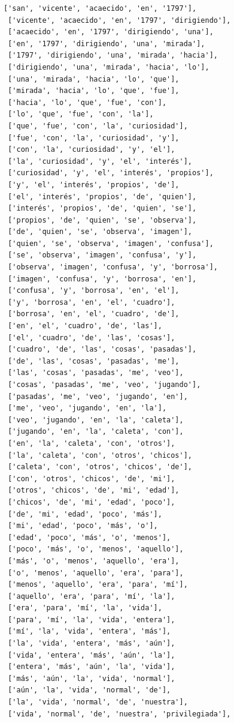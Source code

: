 \documentclass[11pt]{article}
\begin{document}
\begin{tcolorbox}[breakable, size=fbox, boxrule=1pt, pad at break*=1mm,colback=cellbackground, colframe=cellborder]
\begin{Verbatim}[commandchars=\\\{\}]
 ['san', 'vicente', 'acaecido', 'en', '1797'],
 ['vicente', 'acaecido', 'en', '1797', 'dirigiendo'],
 ['acaecido', 'en', '1797', 'dirigiendo', 'una'],
 ['en', '1797', 'dirigiendo', 'una', 'mirada'],
 ['1797', 'dirigiendo', 'una', 'mirada', 'hacia'],
 ['dirigiendo', 'una', 'mirada', 'hacia', 'lo'],
 ['una', 'mirada', 'hacia', 'lo', 'que'],
 ['mirada', 'hacia', 'lo', 'que', 'fue'],
 ['hacia', 'lo', 'que', 'fue', 'con'],
 ['lo', 'que', 'fue', 'con', 'la'],
 ['que', 'fue', 'con', 'la', 'curiosidad'],
 ['fue', 'con', 'la', 'curiosidad', 'y'],
 ['con', 'la', 'curiosidad', 'y', 'el'],
 ['la', 'curiosidad', 'y', 'el', 'interés'],
 ['curiosidad', 'y', 'el', 'interés', 'propios'],
 ['y', 'el', 'interés', 'propios', 'de'],
 ['el', 'interés', 'propios', 'de', 'quien'],
 ['interés', 'propios', 'de', 'quien', 'se'],
 ['propios', 'de', 'quien', 'se', 'observa'],
 ['de', 'quien', 'se', 'observa', 'imagen'],
 ['quien', 'se', 'observa', 'imagen', 'confusa'],
 ['se', 'observa', 'imagen', 'confusa', 'y'],
 ['observa', 'imagen', 'confusa', 'y', 'borrosa'],
 ['imagen', 'confusa', 'y', 'borrosa', 'en'],
 ['confusa', 'y', 'borrosa', 'en', 'el'],
 ['y', 'borrosa', 'en', 'el', 'cuadro'],
 ['borrosa', 'en', 'el', 'cuadro', 'de'],
 ['en', 'el', 'cuadro', 'de', 'las'],
 ['el', 'cuadro', 'de', 'las', 'cosas'],
 ['cuadro', 'de', 'las', 'cosas', 'pasadas'],
 ['de', 'las', 'cosas', 'pasadas', 'me'],
 ['las', 'cosas', 'pasadas', 'me', 'veo'],
 ['cosas', 'pasadas', 'me', 'veo', 'jugando'],
 ['pasadas', 'me', 'veo', 'jugando', 'en'],
 ['me', 'veo', 'jugando', 'en', 'la'],
 ['veo', 'jugando', 'en', 'la', 'caleta'],
 ['jugando', 'en', 'la', 'caleta', 'con'],
 ['en', 'la', 'caleta', 'con', 'otros'],
 ['la', 'caleta', 'con', 'otros', 'chicos'],
 ['caleta', 'con', 'otros', 'chicos', 'de'],
 ['con', 'otros', 'chicos', 'de', 'mi'],
 ['otros', 'chicos', 'de', 'mi', 'edad'],
 ['chicos', 'de', 'mi', 'edad', 'poco'],
 ['de', 'mi', 'edad', 'poco', 'más'],
 ['mi', 'edad', 'poco', 'más', 'o'],
 ['edad', 'poco', 'más', 'o', 'menos'],
 ['poco', 'más', 'o', 'menos', 'aquello'],
 ['más', 'o', 'menos', 'aquello', 'era'],
 ['o', 'menos', 'aquello', 'era', 'para'],
 ['menos', 'aquello', 'era', 'para', 'mí'],
 ['aquello', 'era', 'para', 'mí', 'la'],
 ['era', 'para', 'mí', 'la', 'vida'],
 ['para', 'mí', 'la', 'vida', 'entera'],
 ['mí', 'la', 'vida', 'entera', 'más'],
 ['la', 'vida', 'entera', 'más', 'aún'],
 ['vida', 'entera', 'más', 'aún', 'la'],
 ['entera', 'más', 'aún', 'la', 'vida'],
 ['más', 'aún', 'la', 'vida', 'normal'],
 ['aún', 'la', 'vida', 'normal', 'de'],
 ['la', 'vida', 'normal', 'de', 'nuestra'],
 ['vida', 'normal', 'de', 'nuestra', 'privilegiada'],

\end{Verbatim}
\end{tcolorbox}
\end{document}
